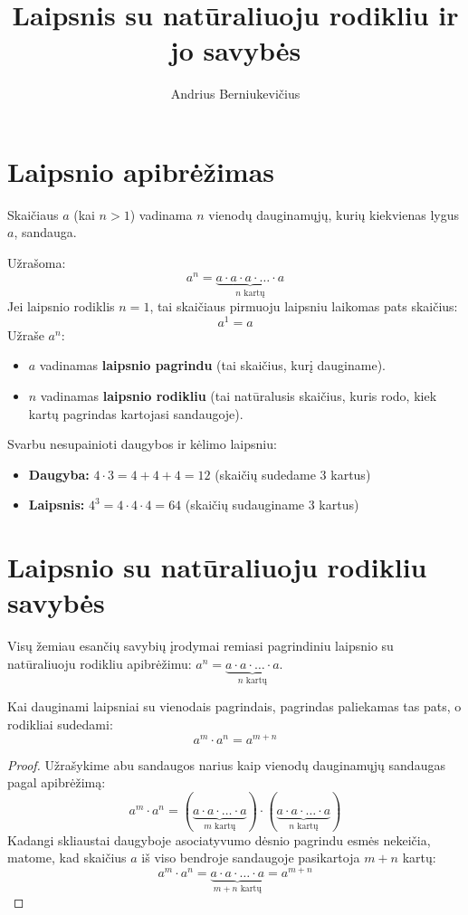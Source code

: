 \documentclass[11pt,a4paper]{scrartcl}
\title{Laipsnis su natūraliuoju rodikliu ir jo savybės}
\author{Andrius Berniukevičius}
\begin{document}
\maketitle


\section{Laipsnio apibrėžimas}

\begin{definition}
   Skaičiaus $a$  (kai $n > 1$) vadinama $n$ vienodų dauginamųjų, kurių kiekvienas lygus $a$, sandauga.
\end{definition}

Užrašoma:
$$a^n = \underbrace{a \cdot a \cdot a \cdot \dots \cdot a}_{n \text{ kartų}}$$
Jei laipsnio rodiklis $n = 1$, tai skaičiaus pirmuoju laipsniu laikomas pats skaičius: $$a^1 = a$$
Užraše $a^n$:
\begin{itemize}
    \item \textbf{$a$} vadinamas \textbf{laipsnio pagrindu} (tai skaičius, kurį dauginame).
    \item \textbf{$n$} vadinamas \textbf{laipsnio rodikliu} (tai natūralusis skaičius, kuris rodo, kiek kartų pagrindas kartojasi sandaugoje).
\end{itemize}

\begin{remark}
    Svarbu nesupainioti daugybos ir kėlimo laipsniu:
\begin{itemize}
    \item \textbf{Daugyba:} $4 \cdot 3 = 4 + 4 + 4 = 12$ (skaičių sudedame $3$ kartus)
    \item \textbf{Laipsnis:} $4^3 = 4 \cdot 4 \cdot 4 = 64$ (skaičių sudauginame $3$ kartus)
\end{itemize}
\end{remark}

\section{Laipsnio su natūraliuoju rodikliu savybės}
Visų žemiau esančių savybių įrodymai remiasi pagrindiniu laipsnio su natūraliuoju rodikliu apibrėžimu: 
$a^n = \underbrace{a \cdot a \cdot \dots \cdot a}_{n \text{ kartų}}$.
\begin{property}
Kai dauginami laipsniai su vienodais pagrindais, pagrindas paliekamas tas pats, o rodikliai sudedami:
$$a^m \cdot a^n = a^{m+n}$$
\end{property}
\begin{proof}
Užrašykime abu sandaugos narius kaip vienodų dauginamųjų sandaugas pagal apibrėžimą:
$$a^m \cdot a^n = (\underbrace{a \cdot a \cdot \dots \cdot a}_{m \text{ kartų}}) \cdot (\underbrace{a \cdot a \cdot \dots \cdot a}_{n \text{ kartų}})$$
Kadangi skliaustai daugyboje asociatyvumo dėsnio pagrindu esmės nekeičia, matome, kad skaičius $a$ iš viso bendroje sandaugoje pasikartoja $m + n$ kartų:
$$a^m \cdot a^n = \underbrace{a \cdot a \cdot \dots \cdot a}_{m+n \text{ kartų}} = a^{m+n}$$
\end{proof}
\end{document}
